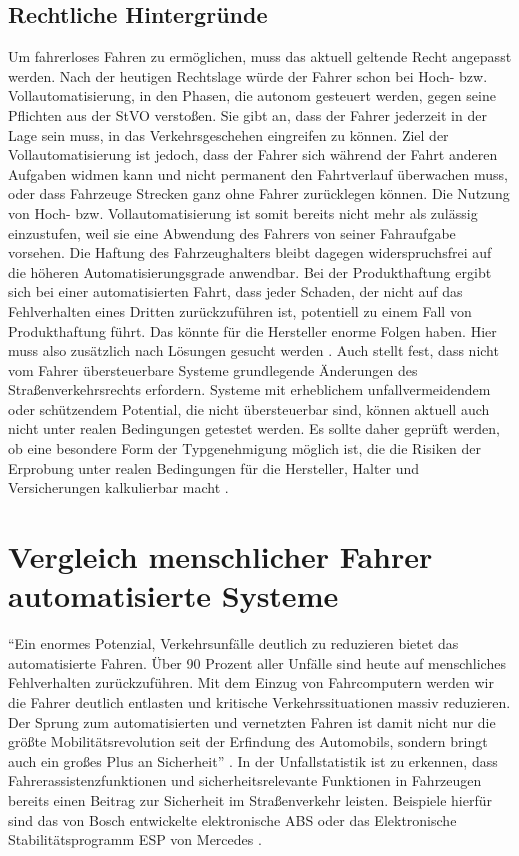 \subsection{Rechtliche Hintergründe}
Um fahrerloses Fahren zu ermöglichen, muss das aktuell geltende Recht angepasst werden. Nach der heutigen Rechtslage würde der Fahrer schon bei Hoch- bzw. Vollautomatisierung, in den Phasen, die autonom gesteuert werden, gegen seine Pflichten aus der StVO verstoßen. Sie gibt an, dass der Fahrer jederzeit in der Lage sein muss, in das Verkehrsgeschehen eingreifen zu können. Ziel der Vollautomatisierung ist jedoch, dass der Fahrer sich während der Fahrt anderen Aufgaben widmen kann und nicht permanent den Fahrtverlauf überwachen muss, oder dass Fahrzeuge Strecken ganz ohne Fahrer zurücklegen können. Die Nutzung von Hoch- bzw. Vollautomatisierung ist somit bereits nicht mehr als zulässig einzustufen, weil sie eine Abwendung des Fahrers von seiner Fahraufgabe vorsehen. Die Haftung des Fahrzeughalters bleibt dagegen widerspruchsfrei auf die höheren Automatisierungsgrade anwendbar. Bei der Produkthaftung ergibt sich bei einer automatisierten Fahrt, dass jeder Schaden, der nicht auf das Fehlverhalten eines Dritten zurückzuführen ist, potentiell zu einem Fall von Produkthaftung führt. Das könnte für die Hersteller enorme Folgen haben. Hier muss also zusätzlich nach Lösungen gesucht werden \parencite[S. 6f]{Gasser.2011}. Auch \Textcite[S. 8]{Mages.2008} stellt fest, dass nicht vom Fahrer übersteuerbare Systeme grundlegende Änderungen des Straßenverkehrsrechts erfordern. Systeme mit erheblichem unfallvermeidendem oder schützendem Potential, die nicht übersteuerbar sind, können aktuell auch nicht unter realen Bedingungen getestet werden. Es sollte daher geprüft werden, ob eine besondere Form der Typgenehmigung möglich ist, die die Risiken der Erprobung unter realen Bedingungen für die Hersteller, Halter und Versicherungen kalkulierbar macht \parencite[S. 89]{WissenschaflicherBeiratbeimBundesministerfurVerkehrBauundStadtentwicklung.2011}. 

\section{Vergleich menschlicher Fahrer automatisierte Systeme}\label{section:Vergleich menschlicher Fahrer automatisierte Systeme}
\enquote{Ein enormes Potenzial, Verkehrsunfälle deutlich zu reduzieren bietet das automatisierte Fahren. Über 90 Prozent aller Unfälle sind heute auf menschliches Fehlverhalten zurückzuführen. Mit dem Einzug von Fahrcomputern werden wir die Fahrer deutlich entlasten und kritische Verkehrssituationen massiv reduzieren. Der Sprung zum automatisierten und vernetzten Fahren ist damit nicht nur die größte Mobilitätsrevolution seit der Erfindung des Automobils, sondern bringt auch ein großes Plus an Sicherheit} \parencite[S. 4]{DEKRA.2017}. In der Unfallstatistik ist zu erkennen, dass Fahrerassistenzfunktionen und sicherheitsrelevante Funktionen in Fahrzeugen bereits einen Beitrag zur Sicherheit im Straßenverkehr leisten. Beispiele hierfür sind das von Bosch entwickelte elektronische \ac{ABS} oder das Elektronische Stabilitätsprogramm \acs{ESP} von Mercedes \parencite[S. 4]{Hillenbrand.2012}.

